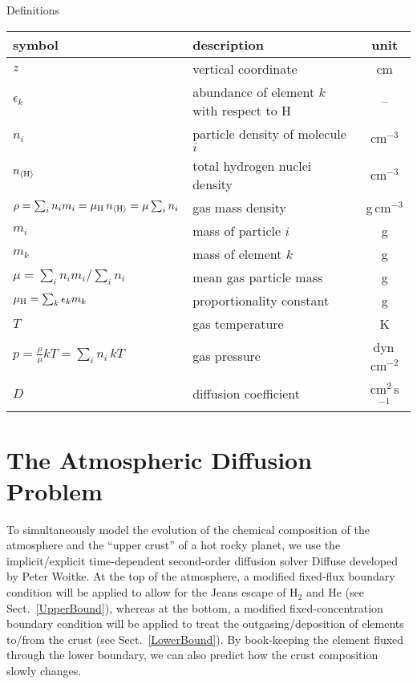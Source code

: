\documentclass[11pt]{article}
\def\nH{n_{\langle\rm H\rangle}}
\def\ek{\epsilon_k}
\begin{document}
\centerline{Definitions}

\begin{tabular}{l|l|c}
\hline
symbol  & description & unit\\
\hline
$z$                       & vertical coordinate    & cm\\
$\ek$                     & abundance of element $k$ 
                            with respect to H      & --\\
$n_i$                     & particle density of molecule $i$ & cm$^{-3}$\\
$\nH$                     & total hydrogen nuclei density & cm$^{-3}$\\
$\rho = \sum_i n_i m_i = \mu_{\rm H}\,\nH = \mu \sum_i n_i$  
                          & gas mass density       & g\,cm$^{-3}$\\
$m_i$                     & mass of particle $i$   & g\\
$m_k$                     & mass of element $k$    & g\\
$\mu = {\sum_i n_i m_i}\Big/{\sum_i n_i}$ 
                          & mean gas particle mass & g\\
$\mu_{\rm H} = \sum_k \epsilon_k m_k$   
                          & proportionality constant & g\\
$T$                       & gas temperature        & K\\
$p = \frac{\rho}{\mu}kT = \sum_i n_i\,kT$  
                          & gas pressure           & dyn\,cm$^{-2}$\\
$D$                       & diffusion coefficient  & cm$^2$\,s$^{-1}$\\
\hline  
\end{tabular}

\bigskip
\section{The Atmospheric Diffusion Problem}

To simultaneously model the evolution of the chemical composition of
the atmosphere and the ``upper crust'' of a hot rocky planet, we use
the implicit/explicit time-dependent second-order diffusion solver
{\sc Diffuse} developed by Peter Woitke.  At the top of the atmosphere, a
modified fixed-flux boundary condition will be applied to allow for
the Jeans escape of H$_2$ and He (see Sect.~\ref{UpperBound}), whereas 
at the bottom, a modified fixed-concentration boundary condition will
be applied to treat the outgasing/deposition of elements to/from the 
crust (see Sect.~\ref{LowerBound}). By book-keeping 
the element fluxed through the lower boundary, we can also predict how
the crust composition slowly changes.
 
\end{document}
